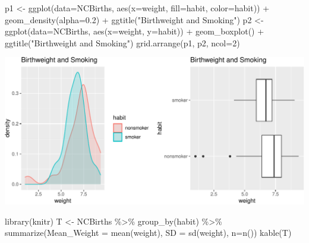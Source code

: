 \documentclass[
  letterpaper,
  DIV=11,
  numbers=noendperiod]{scrreprt}
\newenvironment{Shaded}{\begin{snugshade}}{\end{snugshade}}
\newcommand{\AttributeTok}[1]{\textcolor[rgb]{0.40,0.45,0.13}{#1}}
\newcommand{\DecValTok}[1]{\textcolor[rgb]{0.68,0.00,0.00}{#1}}
\newcommand{\FloatTok}[1]{\textcolor[rgb]{0.68,0.00,0.00}{#1}}
\newcommand{\FunctionTok}[1]{\textcolor[rgb]{0.28,0.35,0.67}{#1}}
\newcommand{\NormalTok}[1]{\textcolor[rgb]{0.00,0.23,0.31}{#1}}
\newcommand{\OtherTok}[1]{\textcolor[rgb]{0.00,0.23,0.31}{#1}}
\newcommand{\SpecialCharTok}[1]{\textcolor[rgb]{0.37,0.37,0.37}{#1}}
\newcommand{\StringTok}[1]{\textcolor[rgb]{0.13,0.47,0.30}{#1}}
\begin{document}
\begin{Shaded}
\begin{Highlighting}[]
\NormalTok{p1 }\OtherTok{\textless{}{-}} \FunctionTok{ggplot}\NormalTok{(}\AttributeTok{data=}\NormalTok{NCBirths, }\FunctionTok{aes}\NormalTok{(}\AttributeTok{x=}\NormalTok{weight, }\AttributeTok{fill=}\NormalTok{habit, }\AttributeTok{color=}\NormalTok{habit)) }\SpecialCharTok{+} \FunctionTok{geom\_density}\NormalTok{(}\AttributeTok{alpha=}\FloatTok{0.2}\NormalTok{) }\SpecialCharTok{+} \FunctionTok{ggtitle}\NormalTok{(}\StringTok{"Birthweight and Smoking"}\NormalTok{)}
\NormalTok{p2 }\OtherTok{\textless{}{-}} \FunctionTok{ggplot}\NormalTok{(}\AttributeTok{data=}\NormalTok{NCBirths, }\FunctionTok{aes}\NormalTok{(}\AttributeTok{x=}\NormalTok{weight, }\AttributeTok{y=}\NormalTok{habit)) }\SpecialCharTok{+} \FunctionTok{geom\_boxplot}\NormalTok{() }\SpecialCharTok{+} \FunctionTok{ggtitle}\NormalTok{(}\StringTok{"Birthweight and Smoking"}\NormalTok{)}
\FunctionTok{grid.arrange}\NormalTok{(p1, p2, }\AttributeTok{ncol=}\DecValTok{2}\NormalTok{)}
\end{Highlighting}
\end{Shaded}

\includegraphics{Ch4_files/figure-pdf/unnamed-chunk-112-1.pdf}

\begin{Shaded}
\begin{Highlighting}[]
\FunctionTok{library}\NormalTok{(knitr)}
\NormalTok{T }\OtherTok{\textless{}{-}}\NormalTok{ NCBirths }\SpecialCharTok{\%\textgreater{}\%} \FunctionTok{group\_by}\NormalTok{(habit) }\SpecialCharTok{\%\textgreater{}\%} \FunctionTok{summarize}\NormalTok{(}\AttributeTok{Mean\_Weight =} \FunctionTok{mean}\NormalTok{(weight), }\AttributeTok{SD =} \FunctionTok{sd}\NormalTok{(weight), }\AttributeTok{n=}\FunctionTok{n}\NormalTok{())}
\FunctionTok{kable}\NormalTok{(T)}
\end{Highlighting}
\end{Shaded}
\end{document}
